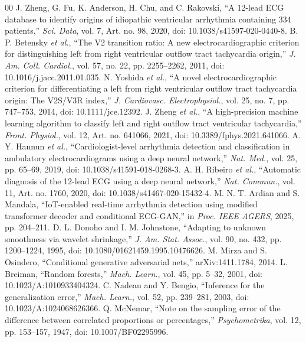 \documentclass[conference,a4paper]{IEEEtran}
\begin{document}
\begin{thebibliography}{00}
 J. Zheng, G. Fu, K. Anderson, H. Chu, and C. Rakovski, ``A 12-lead ECG database to identify origins of idiopathic ventricular arrhythmia containing 334 patients,'' \emph{Sci. Data}, vol. 7, Art. no. 98, 2020, doi: 10.1038/s41597-020-0440-8.
 B. P. Betensky \emph{et al.}, ``The V2 transition ratio: A new electrocardiographic criterion for distinguishing left from right ventricular outflow tract tachycardia origin,'' \emph{J. Am. Coll. Cardiol.}, vol. 57, no. 22, pp. 2255--2262, 2011, doi: 10.1016/j.jacc.2011.01.035.
 N. Yoshida \emph{et al.}, ``A novel electrocardiographic criterion for differentiating a left from right ventricular outflow tract tachycardia origin: The V2S/V3R index,'' \emph{J. Cardiovasc. Electrophysiol.}, vol. 25, no. 7, pp. 747--753, 2014, doi: 10.1111/jce.12392.
 J. Zheng \emph{et al.}, ``A high-precision machine learning algorithm to classify left and right outflow tract ventricular tachycardia,'' \emph{Front. Physiol.}, vol. 12, Art. no. 641066, 2021, doi: 10.3389/fphys.2021.641066.
 A. Y. Hannun \emph{et al.}, ``Cardiologist-level arrhythmia detection and classification in ambulatory electrocardiograms using a deep neural network,'' \emph{Nat. Med.}, vol. 25, pp. 65--69, 2019, doi: 10.1038/s41591-018-0268-3.
 A. H. Ribeiro \emph{et al.}, ``Automatic diagnosis of the 12-lead ECG using a deep neural network,'' \emph{Nat. Commun.}, vol. 11, Art. no. 1760, 2020, doi: 10.1038/s41467-020-15432-4.
 M. N. T. Ardian and S. Mandala, ``IoT-enabled real-time arrhythmia detection using modified transformer decoder and conditional ECG-GAN,'' in \emph{Proc. IEEE AGERS}, 2025, pp. 204--211.
 D. L. Donoho and I. M. Johnstone, ``Adapting to unknown smoothness via wavelet shrinkage,'' \emph{J. Am. Stat. Assoc.}, vol. 90, no. 432, pp. 1200--1224, 1995, doi: 10.1080/01621459.1995.10476626.
 M. Mirza and S. Osindero, ``Conditional generative adversarial nets,'' arXiv:1411.1784, 2014.
 L. Breiman, ``Random forests,'' \emph{Mach. Learn.}, vol. 45, pp. 5--32, 2001, doi: 10.1023/A:1010933404324.
 C. Nadeau and Y. Bengio, ``Inference for the generalization error,'' \emph{Mach. Learn.}, vol. 52, pp. 239--281, 2003, doi: 10.1023/A:1024068626366.
 Q. McNemar, ``Note on the sampling error of the difference between correlated proportions or percentages,'' \emph{Psychometrika}, vol. 12, pp. 153--157, 1947, doi: 10.1007/BF02295996.
\end{thebibliography}
\end{document}
